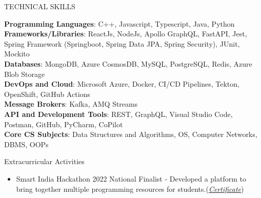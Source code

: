 \documentclass{resume} %
\newcommand\invisible[1]{\textcolor{white}{\fontsize{0}{0}#1}}
\begin{document}
\begin{rSection}{TECHNICAL SKILLS}




\textbf{Programming Languages}: {\normalfont C++, Javascript, Typescript, Java, Python}
\\
\textbf{Frameworks/Libraries}: {\normalfont ReactJs, NodeJs, Apollo GraphQL, FastAPI, Jest, Spring Framework (Springboot, Spring Data JPA, Spring Security), JUnit, Mockito}
 \\
 \textbf{Databases}: {\normalfont MongoDB, Azure CosmosDB, MySQL, PostgreSQL, Redis, Azure Blob Storage}
 \\
 \textbf{DevOps and Cloud}: {\normalfont Microsoft Azure, Docker, CI/CD Pipelines, Tekton, OpenShift, GitHub Actions}
 \\
 \textbf{Message Brokers}: {\normalfont Kafka, AMQ Streams}  
 \\
 \textbf{API and Development Tools}: {\normalfont REST, GraphQL, Visual Studio Code, Postman, GitHub, PyCharm, CoPilot}
\\ \textbf{Core CS Subjects}: {\normalfont Data Structures and Algorithms, OS, Computer Networks, DBMS, OOPs}
\end{rSection}


\begin{rSection}{Extracurricular Activities}

\begin{itemize}
   \item {Smart India Hackathon 2022 National Finalist} - {\normalfont Developed a platform to bring together multiple programming resources for students.}{\normalfont (\href{https://drive.google.com/file/d/1No-u1sUaclG-nf7_Gtym5JDEz1ydyRSL/view?usp=sharing}{\emph{Certificate}})}

\end{itemize}
\end{rSection}





\end{document}
